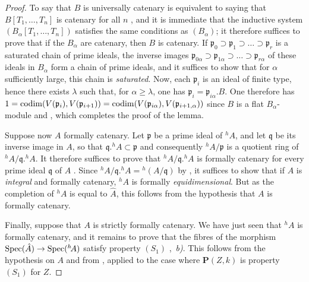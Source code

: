\begin{proof}
To say that $B$ is universally catenary is equivalent to saying that $B[T_1,\ldots,T_n]$ is catenary for all $n$ , and it is immediate that the inductive system $(B_\alpha[T_1,\ldots,T_n])$ satisfies the same conditions as $(B_\alpha)$;
it therefore suffices to prove that if the $B_\alpha$ are catenary, then $B$ is catenary.
If $\mathfrak{p}_0\supset\mathfrak{p}_1\supset\ldots\supset\mathfrak{p}_r$ is a saturated chain of prime ideals, the inverse images $\mathfrak{p}_{0\alpha}\supset\mathfrak{p}_{1\alpha}\supset\ldots\supset\mathfrak{p}_{r\alpha}$ of these ideals in $B_\alpha$ form a chain of prime ideals, and it suffices to show that for $\alpha$ sufficiently large, this chain is \emph{saturated}.
Now, each $\mathfrak{p}_i$ is an ideal of finite type, hence there exists $\lambda$ such that, for $\alpha\geq\lambda$, one has $\mathfrak{p}_i=\mathfrak{p}_{i\alpha}.B$.
One therefore has $1=\operatorname{codim}(V(\mathfrak{p}_i),V(\mathfrak{p}_{i+1}))=\operatorname{codim}(V(\mathfrak{p}_{i\alpha}),V(\mathfrak{p}_{i+1,\alpha}))$ since $B$ is a flat $B_\alpha$-module  and , which completes the proof of the lemma.

Suppose now $A$ formally catenary.
Let $\mathfrak{p}$ be a prime ideal of ${}^h\!A$, and let $\mathfrak{q}$ be its inverse image in $A$, so that $\mathfrak{q}.{}^h\!A\subset\mathfrak{p}$ and consequently ${}^h\!A/\mathfrak{p}$ is a quotient ring of ${}^h\!A/\mathfrak{q}.{}^h\!A$.  It therefore suffices to prove that ${}^h\!A/\mathfrak{q}.{}^h\!A$ is formally catenary for every prime ideal $\mathfrak{q}$ of $A$ .  Since ${}^h\!A/\mathfrak{q}.{}^h\!A={}^h(A/\mathfrak{q})$ by , it suffices  to show that if $A$ is \emph{integral} and formally catenary, ${}^h\!A$ is formally \emph{equidimensional}.
But as the completion of ${}^h\!A$ is equal to $\hat{A}$, this follows from the hypothesis that $A$ is formally catenary.


Finally, suppose that $A$ is strictly formally catenary.  We have just seen that ${}^h\!A$ is formally catenary, and it remains to prove that the fibres of the morphism $\operatorname{Spec}(\hat{A})\to\operatorname{Spec}({}^h\!A)$ satisfy property $(S_1)$ ,~\emph{b)}.  This follows from the hypothesis on $A$ and from , applied to the case where $\boldsymbol{P}(Z,k)$ is property $(S_1)$ for $Z$.
\end{proof}

